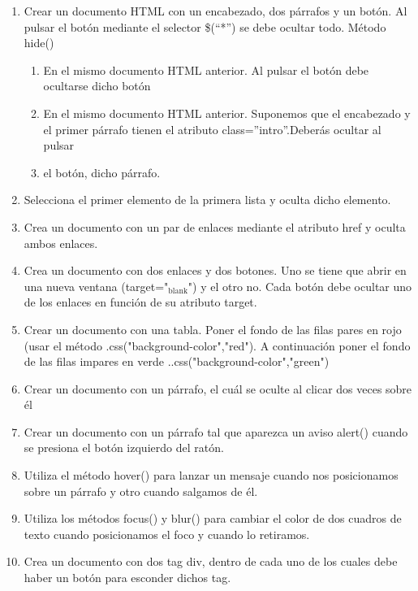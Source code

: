 \documentclass[a4paper, oneside]{article}
\begin{document}
\begin{enumerate}
\item Crear un documento HTML con un encabezado, dos párrafos y un botón. Al pulsar el botón mediante el selector \$(“*”) se debe ocultar todo. Método hide()
\begin{enumerate}
\item En el mismo documento HTML anterior. Al pulsar el botón debe ocultarse dicho botón
\item En el mismo documento HTML anterior. Suponemos que el encabezado y el primer párrafo tienen el atributo class=”intro”.Deberás ocultar al pulsar
\item el botón, dicho párrafo.
\end{enumerate}
\item Selecciona el primer elemento de la primera lista y oculta dicho elemento.

\item Crea un documento con un par de enlaces mediante el atributo href y oculta ambos enlaces.

\item Crea un documento con dos enlaces y dos botones. Uno se tiene que abrir en una nueva ventana (target="\(_{\text{blank}}\)") y el otro no. Cada botón debe ocultar uno de los enlaces en función de su atributo target.

\item Crear un documento con una tabla. Poner el fondo de las filas pares en rojo (usar el método .css("background-color","red"). A continuación poner el fondo de las filas impares en verde ..css("background-color","green")

\item Crear un documento con un párrafo, el cuál se oculte al clicar dos veces sobre él

\item Crear un documento con un párrafo tal que aparezca un aviso alert() cuando se presiona el botón izquierdo del ratón.

\item Utiliza el método hover() para lanzar un mensaje cuando nos posicionamos sobre un párrafo y otro cuando salgamos de él.

\item Utiliza los métodos focus() y blur() para cambiar el color de dos cuadros de texto cuando posicionamos el foco y cuando lo retiramos.

\item Crea un documento con dos tag div, dentro de cada uno de los cuales debe haber un botón para esconder dichos tag.


\end{enumerate}
\end{document}
